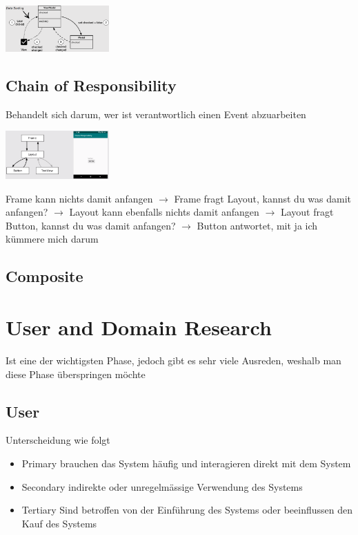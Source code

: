 \documentclass{report}
\newenvironment{Figure}
	{\par\medskip\noindent\minipage{\linewidth}}
	{\endminipage\par\medskip}
\theoremstyle{definition}
\theoremstyle{example}
\begin{document}
\begin{Figure}
   \centering
    \includegraphics[width=150px]{img/MVVM.png}
        \label{fig:MVVM Abbildung}
\end{Figure}

\section{Chain of Responsibility}
Behandelt sich darum, wer ist verantwortlich einen Event abzuarbeiten

\begin{Figure}
   \centering
    \includegraphics[width=150px]{img/CoR.png}
        \label{fig:Chain of Responsibility}
\end{Figure}
Frame kann nichts damit anfangen $\rightarrow$ Frame fragt Layout, kannst du was damit anfangen? $\rightarrow$ Layout kann ebenfalls nichts damit anfangen $\rightarrow$ Layout fragt Button, kannst du was damit anfangen? $\rightarrow$ Button antwortet, mit ja ich kümmere mich darum\\

\section{Composite}


\chapter{User and Domain Research}
Ist eine der wichtigsten Phase, jedoch gibt es sehr viele Ausreden, weshalb man diese Phase überspringen möchte\\

\section{User}
Unterscheidung wie folgt
\begin{itemize}
   \item Primary
   \subitem brauchen das System häufig und interagieren direkt mit dem System 
   \item Secondary
   \subitem indirekte oder unregelmässige Verwendung des Systems 
   \item Tertiary
   \subitem Sind betroffen von der Einführung des Systems oder beeinflussen den Kauf des Systems 
\end{itemize}
\end{document}
